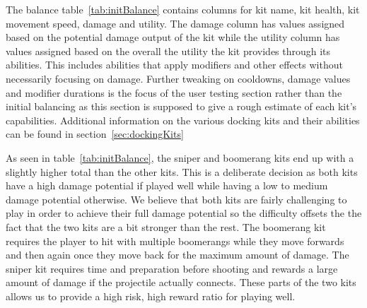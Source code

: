 The balance table~\ref{tab:initBalance} contains columns for kit name, kit health, kit movement speed, damage and utility. The damage column has values assigned based on the potential damage output of the kit while the utility column has values assigned based on the overall the utility the kit provides through its abilities. This includes abilities that apply modifiers and other effects without necessarily focusing on damage. Further tweaking on cooldowns, damage values and modifier durations is the focus of the user testing section rather than the initial balancing as this section is supposed to give a rough estimate of each kit's capabilities. 
Additional information on the various docking kits and their abilities can be found in section~\ref{sec:dockingKits}
     
As seen in table~\ref{tab:initBalance}, the sniper and boomerang kits end up with a slightly higher total than the other kits. This is a deliberate decision as both kits have a high damage potential if played well while having a low to medium damage potential otherwise. We believe that both kits are fairly challenging to play in order to achieve their full damage potential so the difficulty offsets the the fact that the two kits are a bit stronger than the rest. 
The boomerang kit requires the player to hit with multiple boomerangs while they move forwards and then again once they move back for the maximum amount of damage. The sniper kit requires time and preparation before shooting and rewards a large amount of damage if the projectile actually connects.  
These parts of the two kits allows us to provide a high risk, high reward ratio for playing well.